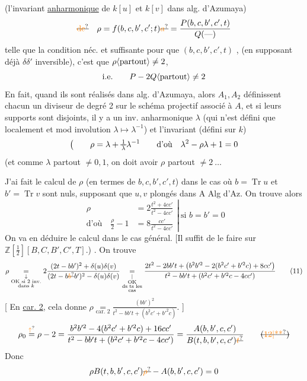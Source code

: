 (l'invariant \uline{anharmonique} de $k[u]$ et $k[v]$ dans alg. d'Azumaya)
\[ \deleted{\unsure{\text{de}}}\quad \rho=f(b,c,b',c';t)\deleted{\unsure{a}}=\frac{P(b,c,b',c',t)}{Q(\text{---})} \]
telle que la condition néc. et suffisante pour que $(b,c,b',c',t)$ ,  (en supposant déjà $\delta\delta'$ inversible), c'est que $\rho\inserted{\text{partout}}\ne2$,
\[ \text{i.e.}\qquad P-2Q\inserted{\text{partout}}\ne2 \]
En fait, quand ils sont réalisés dans alg. d'Azumaya,  alors $A_1,A_2$ définissent  chacun un diviseur de degré 2 sur  le schéma projectif associé à $A$, et si leurs supports sont disjoints, il y a un inv. anharmonique $\lambda$ (qui n'est défini que localement  et mod involution $\lambda\mapsto\lambda^{-1}$) et l'invariant (défini sur $k$)
\[ \bigl(\qquad \rho=\lambda+\deleted{\frac{1}{\lambda}}\lambda^{-1}\qquad \text{d'où}\quad \lambda^2-\rho\lambda+1=0 \]
(et comme $\lambda$ partout $\ne0,1$, on doit avoir $\rho$ partout $\ne2\ \ldots$

J'ai fait le calcul de $\rho$ (en termes de $b,c,b',c',t$) dans le cas où $b=\operatorname{Tr}u$ et $b'=\operatorname{Tr}v$ sont nuls,  supposant que $u,v$ plongés dans A Alg d'Az. On trouve alors
\[
\left.\begin{aligned}
\rho&=2\frac{t^2+4cc'}{t^2-4cc'}\\
\text{d'où}\quad \frac{\rho}{2}-1&=8\frac{cc'}{t^2-4cc'}
\end{aligned}\right|\ \text{si } b=b'=0
\]
On va en déduire le calcul dans le cas général. [Il suffit de le faire sur $\mathbb Z[\frac12][B,C,B',C',T]$.) . On trouve
\[
\rho\underset{\substack{\downarrow\\\text{OK si 2 inv.}\\\text{dans }k}}{=}
2\frac{(2t-bb')^2+\delta(u)\delta(v)}{(2t-b\deleted{\unsure{b}}b')^2-\delta(u)\delta(v)}
\underset{\substack{|\\\text{OK}\\\text{ds ts les}\\\text{cas}}}{=}
\frac{2t^2-2bb't+\bigl(b^2b'^2-2(b^2c'+b'^2c)+8cc'\bigr)}
{t^2-bb't+(b^2c'+b'^2c-4cc')} \tag*{(11)}
\]
[ En \uline{car. 2}, cela donne $\displaystyle\rho\underset{\text{car. 2}}{=}\frac{(bb')^2}{t^2-bb't+(b^2c'+b'^2c)}$. ]
\[
\rho_0\overset{\unsure{\uparrow}}{=}\rho-2
=\frac{b^2b'^2-4(b^2c'+b'^2c)+16cc'}{t^2-bb't+(b^2c'+b'^2c-4cc')}
=\frac{A(b,b',c,c')}{B(t,b,b',c,c')\deleted{\unsure{t}}}
\tag*{\deleted{(\unsure{12|**})}}
\]
Donc
\[ \rho B(t,b,b',c,c')\deleted{\unsure{\rho}}-A(b,b',c,c')=0 \]

